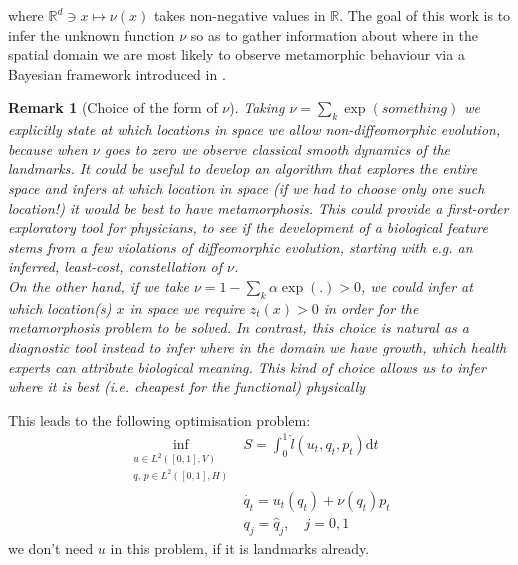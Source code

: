 \documentclass{article}
\newtheorem{remark}{Remark}
\newcommand{\diff}[1]{\text{d} #1}
\newcommand{\Rd}{\mathbb{R}^{d}}
\begin{document}
where $\Rd\ni x\mapsto\nu (x)$ takes non-negative values in $\mathbb R$. The
goal of this work is to infer the unknown function $\nu$ so as to gather
information about where in the spatial domain we are most likely to observe
metamorphic behaviour via a Bayesian framework introduced in
\cite{stuart_something}.

\begin{remark}[Choice of the form of $\nu$]
Taking $\nu = \sum_k \exp(something)$ we explicitly state at which locations in
space we allow non-diffeomorphic evolution, because when $\nu$ goes to zero we
observe classical smooth dynamics of the landmarks. It could be useful to
develop an algorithm that explores the entire space and infers at which location
in space (if we had to choose only one such location!) it would be best to have
metamorphosis. This could provide a first-order exploratory tool for physicians,
to see if the development of a biological feature stems from a few violations of
diffeomorphic evolution, starting with e.g. an inferred, least-cost,
constellation of $\nu$.\\
On the other hand, if we take $\nu =1 - \sum_k \alpha \exp(.)>0$, we could infer
at which location(s) $x$ in space we require $z_t(x)>0$ in order for the
metamorphosis problem to be solved. In contrast, this choice is natural as a
diagnostic tool instead to infer where in the domain we have growth, which
health experts can attribute biological meaning. This kind of choice allows us
to infer where it is best (i.e. cheapest for the functional) \emph{physically}
\end{remark}

This leads to the following optimisation problem:
\begin{subequations}\label{pbl:selective_mm}
\begin{align}
\inf_{\substack{u\in L^2([0,1],V)\\q,\, p \in L^2([0,1],H)}} & S = \int_0^1
\hat l(u_t, q_t, p_t)\diff{t}\label{nu_fnl}\\
& \dot{q_t} = u_t ( q_t) + \nu(q_t)p_t \\
    & q_j = \hat q_j, \quad j=0,1
\end{align}
\end{subequations}
{\color{red} we don't need $u$ in this problem, if it is landmarks already.}
\end{document}
